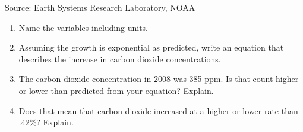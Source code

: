 \begin{enumerate}
 \hfill \begin{footnotesize} Source: Earth Systems Research Laboratory, NOAA \end{footnotesize}
\begin{enumerate}
\item Name the variables including units.     \vfill
\item Assuming the growth is exponential as predicted, write an equation that describes the increase in carbon dioxide concentrations.   \vfill
\item The carbon dioxide concentration in 2008 was 385 ppm. Is that count higher or lower than predicted from your equation?  Explain.   \vfill
\item Does that mean that carbon dioxide increased at a higher or lower rate than .42\%?  Explain.   \vfill
\end{enumerate}

\end{enumerate}


